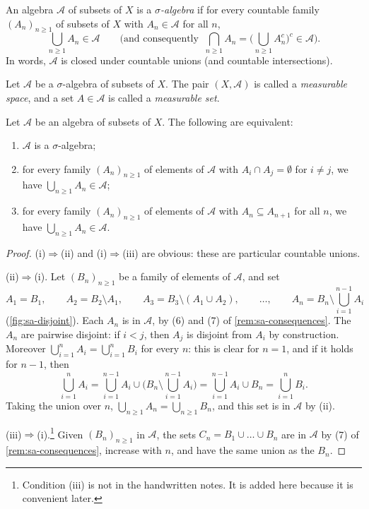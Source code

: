 \begin{definition}\label{def:sa-sigma-algebra}
An algebra $\mathcal A$ of subsets of $X$ is a \emph{$\sigma$-algebra} if for every countable
family $(A_n)_{n\ge1}$ of subsets of $X$ with $A_n\in\mathcal A$ for all $n$,
\[
  \bigcup_{n\ge1}A_n\in\mathcal A
  \qquad\Big(\text{and consequently }\ \bigcap_{n\ge1}A_n=\Big(\bigcup_{n\ge1}A_n^c\Big)^c\in\mathcal A\Big).
\]
In words, $\mathcal A$ is closed under countable unions (and countable intersections).
\end{definition}

\begin{definition}\label{def:sa-measurable-space}
Let $\mathcal A$ be a $\sigma$-algebra of subsets of $X$. The pair $(X,\mathcal A)$ is called a
\emph{measurable space}, and a set $A\in\mathcal A$ is called a \emph{measurable set}.
\end{definition}

\begin{proposition}\label{prop:sa-algebra-is-sigma}
Let $\mathcal A$ be an algebra of subsets of $X$. The following are equivalent:
\begin{enumerate}[label=(\roman*)]
  \item $\mathcal A$ is a $\sigma$-algebra;
  \item for every family $(A_n)_{n\ge1}$ of elements of $\mathcal A$ with $A_i\cap A_j=\emptyset$
    for $i\ne j$, we have $\bigcup_{n\ge1}A_n\in\mathcal A$;
  \item for every family $(A_n)_{n\ge1}$ of elements of $\mathcal A$ with $A_n\subseteq A_{n+1}$
    for all $n$, we have $\bigcup_{n\ge1}A_n\in\mathcal A$.
\end{enumerate}
\end{proposition}

\begin{proof}
(i)$\Rightarrow$(ii) and (i)$\Rightarrow$(iii) are obvious: these are particular countable unions.

(ii)$\Rightarrow$(i). Let $(B_n)_{n\ge1}$ be a family of elements of $\mathcal A$, and set
\[
  A_1=B_1,\qquad A_2=B_2\setminus A_1,\qquad A_3=B_3\setminus(A_1\cup A_2),\qquad\dots,\qquad
  A_n=B_n\setminus\bigcup_{i=1}^{n-1}A_i
\]
(\cref{fig:sa-disjoint}). Each $A_n$ is in $\mathcal A$, by (6) and (7) of \cref{rem:sa-consequences}. The $A_n$ are pairwise
disjoint: if $i<j$, then $A_j$ is disjoint from $A_i$ by construction. Moreover
$\bigcup_{i=1}^nA_i=\bigcup_{i=1}^nB_i$ for every $n$: this is clear for $n=1$, and if it holds
for $n-1$, then
\[
  \bigcup_{i=1}^nA_i=\bigcup_{i=1}^{n-1}A_i\cup\Big(B_n\setminus\bigcup_{i=1}^{n-1}A_i\Big)
  =\bigcup_{i=1}^{n-1}A_i\cup B_n=\bigcup_{i=1}^nB_i .
\]
Taking the union over $n$, $\bigcup_{n\ge1}A_n=\bigcup_{n\ge1}B_n$, and this set is in $\mathcal A$
by (ii).

(iii)$\Rightarrow$(i).\footnote{Condition (iii) is not in the handwritten notes. It is added here
because it is convenient later.} Given $(B_n)_{n\ge1}$ in $\mathcal A$, the sets $C_n=B_1\cup\dots\cup B_n$
are in $\mathcal A$ by (7) of \cref{rem:sa-consequences}, increase with $n$, and have the same union as the $B_n$.
\end{proof}

